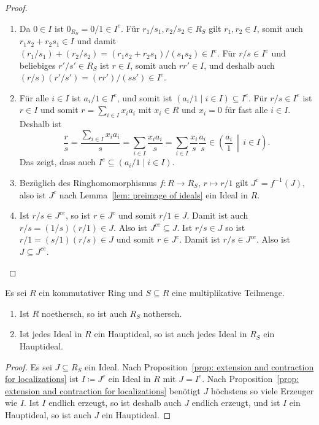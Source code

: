 \documentclass[a4paper,10pt]{scrartcl}
\begin{document}
\begin{proof}
  \begin{enumerate}
    \item
      Da $0 \in I$ ist $0_{R_S} = 0/1 \in I^e$.
      Für $r_1/s_1, r_2/s_2 \in R_S$ gilt $r_1, r_2 \in I$, somit auch $r_1 s_2 + r_2 s_1 \in I$ und damit $(r_1/s_1) + (r_2/s_2) = (r_1 s_2 + r_2 s_1)/(s_1 s_2) \in I^e$.
      Für $r/s \in I^e$ und beliebiges $r'/s' \in R_S$ ist $r \in I$, somit auch $r r' \in I$, und deshalb auch $(r/s)(r'/s') = (r r')/(s s') \in I^e$.
    \item
      Für alle $i \in I$ ist $a_i/1 \in I^e$, und somit ist $(a_i/1 \mid i \in I) \subseteq I^e$.
      Für $r/s \in I^e$ ist $r \in I$ und somit $r = \sum_{i \in I} x_i a_i$ mit $x_i \in R$ und $x_i = 0$ für fast alle $i \in I$.
      Deshalb ist
      \[
            \frac{r}{s}
        =   \frac{\sum_{i \in I} x_i a_i}{s}
        =   \sum_{i \in I} \frac{x_i a_i}{s}
        =   \sum_{i \in I} \frac{x_i}{s} \frac{a_i}{s}
        \in \left( \frac{a_i}{1} \,\middle|\, i \in I \right).
      \]
      Das zeigt, dass auch $I^e \subseteq (a_i/1 \mid i \in I)$.
    \item
      Bezüglich des Ringhomomorphismus $f \colon R \to R_S$, $r \mapsto r/1$ gilt $J^c = f^{-1}(J)$, also ist $J^c$ nach Lemma~\ref{lem: preimage of ideals} ein Ideal in $R$.
    \item
      Ist $r/s \in J^{ce}$, so ist $r \in J^c$ und somit $r/1 \in J$.
      Damit ist auch $r/s = (1/s)(r/1) \in J$.
      Also ist $J^{ce} \subseteq J$.
      Ist $r/s \in J$ so ist $r/1 = (s/1)(r/s) \in J$ und somit $r \in J^c$.
      Damit ist $r/s \in J^{ce}$.
      Also ist $J \subseteq J^{ce}$.
  \end{enumerate}
\end{proof}


\begin{corollary}
  Es sei $R$ ein kommutativer Ring und $S \subseteq R$ eine multiplikative Teilmenge.
  \begin{enumerate}
    \item
      Ist $R$ noethersch, so ist auch $R_S$ nothersch.
    \item
      Ist jedes Ideal in $R$ ein Hauptideal, so ist auch jedes Ideal in $R_S$ ein Hauptideal.
  \end{enumerate}
\end{corollary}


\begin{proof}
  Es sei $J \subseteq R_S$ ein Ideal.
  Nach Proposition~\ref{prop: extension and contraction for localizations} ist $I \coloneqq J^c$ ein Ideal in $R$ mit $J = I^e$.
  Nach Proposition~\ref{prop: extension and contraction for localizations} benötigt $J$ höchstens so viele Erzeuger wie $I$.
  Ist $I$ endlich erzeugt, so ist deshalb auch $J$ endlich erzeugt, und ist $I$ ein Hauptideal, so ist auch $J$ ein Hauptideal.
\end{proof}
\end{document}
